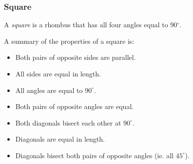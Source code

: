     \addtocounter{footnote}{-0}
    
        
        \label{m39354*uid76}
            \subsubsection{ Square}
            \nopagebreak
            
          
          \label{m39354*id319154}A \textsl{square} is a rhombus that has all four angles equal to 90\begin{math}{}^{\circ }\end{math}.\par 
          \label{m39354*id319177}A summary of the properties of a square is:\par 
          \label{m39354*id319181}\begin{itemize}[noitemsep]
            \label{m39354*uid77}\item Both pairs of opposite sides are parallel.
\label{m39354*uid78}\item All sides are equal in length.
\label{m39354*uid79}\item All angles are equal to \begin{math}{90}^{\circ }\end{math}.
\label{m39354*uid80}\item Both pairs of opposite angles are equal.
\label{m39354*uid81}\item Both diagonals bisect each other at \begin{math}{90}^{\circ }\end{math}.
\label{m39354*uid82}\item Diagonals are equal in length.
\label{m39354*uid83}\item Diagonals bisect both pairs of opposite angles (ie. all \begin{math}{45}^{\circ }\end{math}).
\end{itemize}
        
          
    \setcounter{subfigure}{0}


